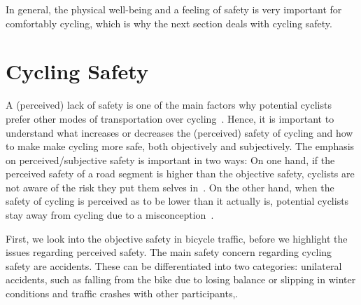 In general, the physical well-being and a feeling of safety is very important for comfortably cycling, which is why the next section deals with cycling safety.
  

\section{Cycling Safety}
\label{sec:cycling_safety_background}
A (perceived) lack of safety is one of the main factors why potential cyclists prefer other modes of transportation over cycling~\cite{felix2020build,nazemi2021studying,lawson2013perception}.
Hence, it is important to understand what increases or decreases the (perceived) safety of cycling and how to make make cycling more safe, both objectively and subjectively.
The emphasis on perceived/subjective safety is important in two ways:
On one hand, if the perceived safety of a road segment is higher than the objective safety, cyclists are not aware of the risk they put them selves in~\cite{christ2023perceiving}.
On the other hand, when the safety of cycling is perceived as to be lower than it actually is, potential cyclists stay away from cycling due to a misconception~\cite{noland1995perceived}.

First, we look into the objective safety in bicycle traffic, before we highlight the issues regarding perceived safety.
The main safety concern regarding cycling safety are accidents.
These can be differentiated into two categories:  unilateral accidents, such as falling from the bike due to losing balance or slipping in winter conditions and traffic crashes with other participants,.

